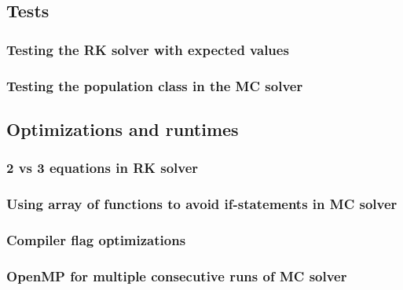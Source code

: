 \subsection{Tests}

\subsubsection{Testing the RK solver with expected values}

\subsubsection{Testing the population class in the MC solver}

\subsection{Optimizations and runtimes}

\subsubsection{2 vs 3 equations in RK solver}

\subsubsection{Using array of functions to avoid if-statements in MC solver}

\subsubsection{Compiler flag optimizations}

\subsubsection{OpenMP for multiple consecutive runs of MC solver}